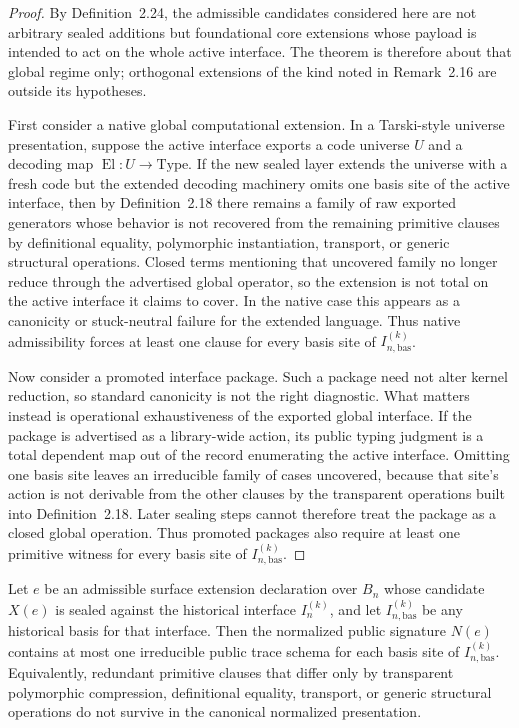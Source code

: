 \begin{proof}
By Definition~2.24, the admissible candidates considered here are not arbitrary sealed
additions but foundational core extensions whose payload is intended to act on the whole
active interface.  The theorem is therefore about that global regime only; orthogonal
extensions of the kind noted in Remark~2.16 are outside its hypotheses.

First consider a native global computational extension.  In a Tarski-style universe
presentation, suppose the active interface exports a code universe \(U\) and a decoding map
\(\operatorname{El}:U\to\mathrm{Type}\).  If the new sealed layer extends the universe with a
fresh code but the extended decoding machinery omits one basis site of the active interface,
then by Definition~2.18 there remains a family of raw exported generators whose behavior is
not recovered from the remaining primitive clauses by definitional equality, polymorphic
instantiation, transport, or generic structural operations.  Closed terms mentioning that
uncovered family no longer reduce through the advertised global operator, so the extension
is not total on the active interface it claims to cover.  In the native case this appears as a
canonicity or stuck-neutral failure for the extended language.  Thus native admissibility
forces at least one clause for every basis site of \(I_{n,\mathrm{bas}}^{(k)}\).

Now consider a promoted interface package.  Such a package need not alter kernel reduction,
so standard canonicity is not the right diagnostic.  What matters instead is operational
exhaustiveness of the exported global interface.  If the package is advertised as a
library-wide action, its public typing judgment is a total dependent map out of the record
enumerating the active interface.  Omitting one basis site leaves an irreducible family of
cases uncovered, because that site's action is not derivable from the other clauses by the
transparent operations built into Definition~2.18.  Later sealing steps cannot therefore treat
the package as a closed global operation.  Thus promoted packages also require at least one
primitive witness for every basis site of \(I_{n,\mathrm{bas}}^{(k)}\).
\end{proof}

\begin{proposition}
Let \(e\) be an admissible surface extension declaration over \(B_n\) whose candidate
\(X(e)\) is sealed against the historical interface \(I_n^{(k)}\), and let
\(I_{n,\mathrm{bas}}^{(k)}\) be any historical basis for that interface.  Then the normalized public
signature \(N(e)\) contains at most one irreducible public trace schema for each basis site of
\(I_{n,\mathrm{bas}}^{(k)}\).  Equivalently, redundant primitive clauses that differ only by
transparent polymorphic compression, definitional equality, transport, or generic structural
operations do not survive in the canonical normalized presentation.
\end{proposition}

